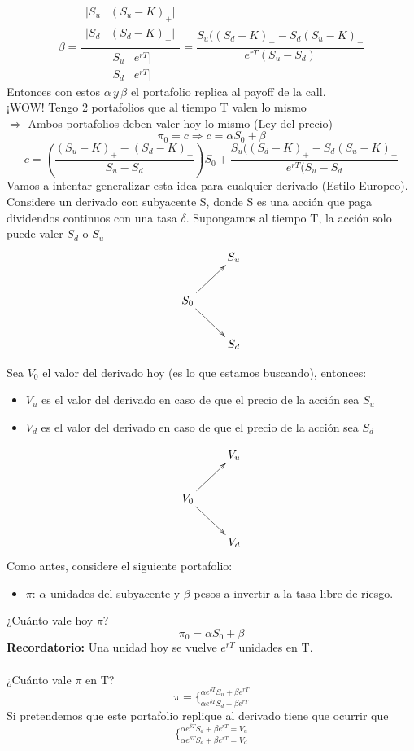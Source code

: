 \documentclass[12pts]{extarticle}
\begin{document}
$$\beta=\frac{ \begin{matrix} 
                            |S_u & (S_u-K)_+| \\ |S_d & (S_d-K)_+|\end{matrix} }{\begin{matrix}
                                                                                                                          |S_u & e^{rT}| \\| S_d & e^{rT} |\end{matrix}}=\frac{S_u((S_d-K)_+ -S_d(S_u-K)_+}{e^{rT}(S_u-S_d)}$$
Entonces con estos $\alpha \, y \, \beta$ el portafolio replica al payoff de la call. \\
¡WOW! Tengo 2 portafolios que al tiempo T valen lo mismo \\
$\Rightarrow$ Ambos portafolios deben valer hoy lo mismo (Ley del precio) 
$$\pi_0=c \Rightarrow c=\alpha S_0 +\beta$$
$$c=(\frac{(S_u-K)_+ -(S_d-K)_+}{S_u-S_d})S_0+\frac{S_u((S_d-K)_+ -S_d(S_u-K)_+}{e^{rT}(S_u-S_d}$$
Vamos a intentar generalizar esta idea para cualquier derivado (Estilo Europeo).
\\ 
Considere un derivado con subyacente S, donde S es una acción que paga dividendos continuos con una tasa $\delta$. Supongamos al tiempo T, la acción solo puede valer $S_d$ o $S_u$
$$\xymatrix{&S_u  \\ S_0 \ar[ru] \ar[rd] & \\ &S_d }$$ 
                  
Sea $V_0$ el valor del derivado hoy (es lo que estamos buscando), entonces: 
\begin{itemize}
\item $V_u$ es el valor del derivado en caso de que el precio de la acción sea $S_u$
\item $V_d$ es el valor del derivado en caso de que el precio de la acción sea $S_d$
\end{itemize}
$$\xymatrix{&V_u  \\ V_0 \ar[ru] \ar[rd] & \\ &V_d }$$
Como antes, considere el siguiente portafolio: 
\begin{itemize} 
\item $\pi$: $\alpha$ unidades del subyacente y $\beta$ pesos a invertir a la tasa libre de riesgo. 
\end{itemize}
¿Cuánto vale hoy $\pi$?
$$\pi_0=\alpha S_0+\beta$$ 
\textbf{Recordatorio:} Una unidad hoy se vuelve $e^{rT}$ unidades en T. 
\\  \\ 
¿Cuánto vale $\pi$ en T? 
$$\pi= \Bigg \{_{\alpha e^{\delta T} S_d +\beta e^{rT}}^{\alpha e^{ \delta T} S_u +\beta e^{rT}}$$
Si pretendemos que este portafolio replique al derivado tiene que ocurrir que 
$$\Bigg \{_{\alpha e^{\delta T}S_d +\beta e^{rT}=V_d}^{\alpha e^{\delta T}S_d+\beta e^{rT}=V_u}$$
\end{document}
